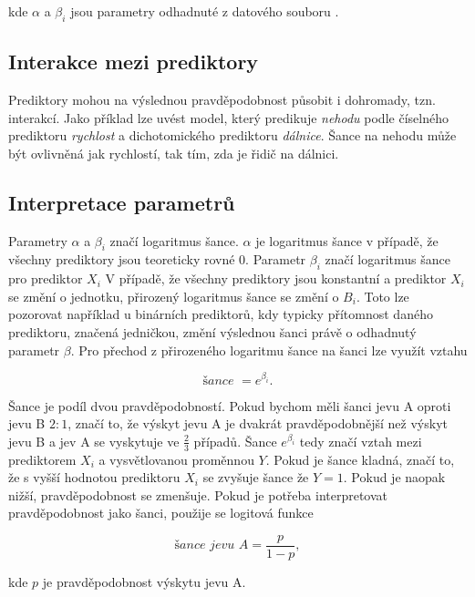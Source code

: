 kde $\alpha$ a $\beta_i$ jsou parametry odhadnuté z datového souboru \cite{kleinbaum_logistic_2010}.

\subsection{Interakce mezi prediktory}
Prediktory mohou na výslednou pravděpodobnost působit i dohromady, tzn. interakcí. Jako příklad lze uvést model, který predikuje \textit{nehodu} podle
číselného prediktoru \textit{rychlost} a dichotomického prediktoru \textit{dálnice}. Šance na nehodu může být ovlivněná jak rychlostí, tak tím, zda je 
řidič na dálnici. 


\subsection{Interpretace parametrů}
Parametry $\alpha$ a $\beta_i$ značí logaritmus šance. $\alpha$ je logaritmus šance v případě, že všechny prediktory
jsou teoreticky rovné $0$. Parametr $\beta_i$ značí logaritmus šance pro prediktor $X_i$
V případě, že všechny prediktory jsou konstantní a prediktor $X_i$ se změní o jednotku, přirozený logaritmus
šance se změní o $B_i$. Toto lze pozorovat například u binárních prediktorů, kdy typicky přítomnost
daného prediktoru, značená jedničkou, změní výslednou šanci právě o odhadnutý parametr $\beta$.
Pro přechod z přirozeného logaritmu šance na šanci lze využít vztahu

\begin{equation}
\textit{šance } = e^{\beta_i}.
\end{equation}

Šance je podíl dvou pravděpodobností. Pokud bychom měli šanci jevu A oproti jevu B $2 : 1$, značí to, že výskyt jevu A je dvakrát pravděpodobnější než
výskyt jevu B a jev A se vyskytuje ve $\frac{2}{3}$ případů. Šance $e^{\beta_i}$ tedy značí vztah mezi prediktorem $X_i$ a vysvětlovanou proměnnou $Y$. Pokud je
šance kladná, značí to, že s vyšší hodnotou prediktoru $X_i$ se zvyšuje šance že $Y = 1$. Pokud je naopak nižší, pravděpodobnost se zmenšuje. Pokud je potřeba
interpretovat pravděpodobnost jako šanci, použije se logitová funkce

\begin{equation}
    \label{eq:logitova_funkce}
    \textit{šance jevu A} = \frac{p}{1 - p},
\end{equation}

kde $p$ je pravděpodobnost výskytu jevu A.

